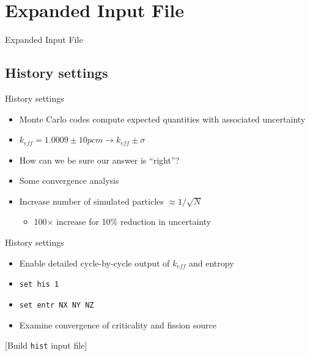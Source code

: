 \documentclass{beamer}
\newcommand{\examplefile}[1]{\centerline{[Build \texttt{#1} input file]}}
\begin{document}
\section{Expanded Input File}

\begin{frame}{Expanded Input File}
    \tableofcontents[sectionstyle=show/hide,subsectionstyle=show/show/hide]
\end{frame}

\subsection{History settings}

\begin{frame}{History settings}
    \begin{itemize}
        \item Monte Carlo codes compute expected quantities with associated uncertainty
        \item $k_{eff}=1.0009\pm 10 pcm \rightarrow k_{eff} \pm \sigma$
        \item How can we be sure our answer is ``right''?
        \item Some convergence analysis
        \item Increase number of simulated particles $\approx 1/\sqrt{N}$
        \begin{itemize}
            \item 100$\times$ increase for 10\% reduction in uncertainty
        \end{itemize}
    \end{itemize}
\end{frame}

\begin{frame}{History settings}
    \begin{itemize}
        \item Enable detailed cycle-by-cycle output of $k_{eff}$ and entropy
        \item \texttt{set his 1}
        \item \texttt{set entr NX NY NZ}
        \item Examine convergence of criticality and fission source
    \end{itemize}
    \examplefile{hist}
\end{frame}
\end{document}
